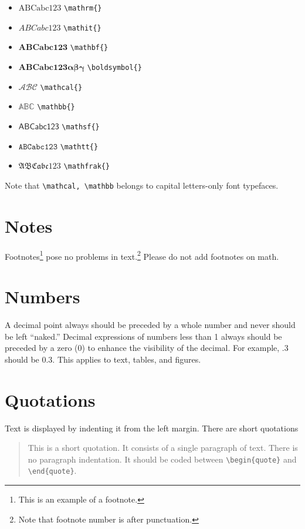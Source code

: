 \documentclass[qe,nameyear,draft]{econsocart}
\theoremstyle{plain}
\begin{document}
\begin{itemize}
\item $\mathrm{ABCabc123}$ \texttt{{\textbackslash}mathrm\{\}}
\item $\mathit{ABCabc123}$ \texttt{{\textbackslash}mathit\{\}}
\item $\mathbf{ABCabc123}$ \texttt{{\textbackslash}mathbf\{\}}
\item $\boldsymbol{ABCabc123\alpha\beta\gamma}$ \texttt{{\textbackslash}boldsymbol\{\}}
\item $\mathcal{ABC}$ \texttt{{\textbackslash}mathcal\{\}}
\item $\mathbb{ABC}$ \texttt{{\textbackslash}mathbb\{\}}
\item $\mathsf{ABCabc123}$ \texttt{{\textbackslash}mathsf\{\}}
\item $\mathtt{ABCabc123}$ \texttt{{\textbackslash}mathtt\{\}}
\item $\mathfrak{ABCabc123}$ \texttt{{\textbackslash}mathfrak\{\}}
\end{itemize}

Note that \texttt{{\textbackslash}mathcal, {\textbackslash}mathbb} belongs to capital letters-only font typefaces.

\section{Notes}

Footnotes\footnote{This is an example of a footnote.}
pose no problems in text.\footnote{Note that footnote number is after punctuation.} Please do not add footnotes on math.

\section{Numbers}

A decimal point always should be preceded by a whole number and never should be left ``naked.'' Decimal expressions of numbers less than 1 always should be preceded by a zero (0) to enhance the visibility of the decimal. For example, .3 should be 0.3. This applies to text, tables, and figures.

\section{Quotations}

Text is displayed by indenting it from the left margin. There are short quotations

\begin{quote}
This is a short quotation. It consists of a
single paragraph of text. There is no paragraph
indentation. It should be coded between \texttt{{\textbackslash}begin\{quote\}} and \texttt{{\textbackslash}end\{quote\}}.
\end{quote}
\end{document}
